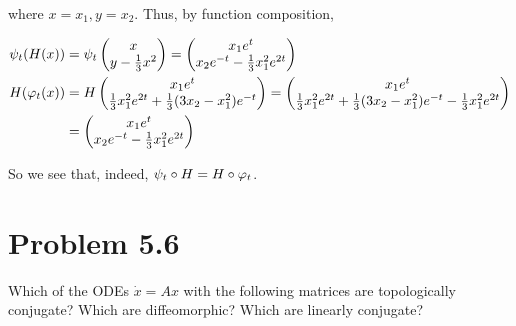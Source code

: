 \begin{solution}
    where $x = x_1, y = x_2$. Thus, by function composition, 

    \alignbreak
    \begin{align}
        \psi_t(H(x)) &= \psi_t \begin{pmatrix} x\\ y - \frac{1}{3}x^2\end{pmatrix}\nonumber =  \begin{pmatrix}x_1e^t\\ x_2e^{-t} - \frac{1}{3}x_1^2e^{2t}\end{pmatrix}\nonumber\\
        H(\varphi_t(x)) &= H\begin{pmatrix}x_1e^t\\\frac{1}{3}x_1^2e^{2t} + \frac{1}{3}(3x_2 - x_1^2)e^{-t}\end{pmatrix} = \begin{pmatrix} x_1e^t\\ \frac{1}{3}x_1^2e^{2t} + \frac{1}{3}(3x_2 - x_1^2)e^{-t} - \frac{1}{3}x_1^2e^{2t}\end{pmatrix}\nonumber\\
        &= \begin{pmatrix}x_1e^t\\ x_2e^{-t} - \frac{1}{3}x_1^2e^{2t}\end{pmatrix}\nonumber
    \end{align}
    \alignbreak

    So we see that, indeed, $\psi_t \circ H = H \circ \varphi_t$.
\end{solution}

\newpage
\section{Problem 5.6}
Which of the ODEs $\dot{x} = Ax$ with the following matrices are topologically conjugate? Which are diffeomorphic? Which are linearly conjugate?

